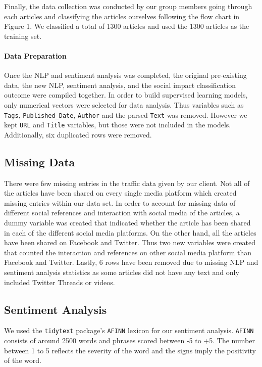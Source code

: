 \documentclass[10pt,letterpaper]{article}
\begin{document}
Finally, the data collection was conducted by our group members going
through each articles and classifying the articles ourselves following
the flow chart in Figure 1. We classified a total of 1300 articles and
used the 1300 articles as the training set.

\hypertarget{data-preparation}{%
\paragraph{Data Preparation}\label{data-preparation}}

Once the NLP and sentiment analysis was completed, the original
pre-existing data, the new NLP, sentiment analysis, and the social
impact classification outcome were compiled together. In order to build
supervised learning models, only numerical vectors were selected for
data analysis. Thus variables such as \texttt{Tags},
\texttt{Published\_Date}, \texttt{Author} and the parsed \texttt{Text}
was removed. However we kept \texttt{URL} and \texttt{Title} variables,
but those were not included in the models. Additionally, six duplicated
rows were removed.

\subsection{Missing Data}\label{missing-data}

There were few missing entries in the traffic data given by our client.
Not all of the articles have been shared on every single media platform
which created missing entries within our data set. In order to account
for missing data of different social references and interaction with
social media of the articles, a dummy variable was created that
indicated whether the article has been shared in each of the different
social media platforms. On the other hand, all the articles have been
shared on Facebook and Twitter. Thus two new variables were created that
counted the interaction and references on other social media platform
than Facebook and Twitter. Lastly, 6 rows have been removed due to
missing NLP and sentiment analysis statistics as some articles did not
have any text and only included Twitter Threads or videos.

\subsection{Sentiment Analysis}\label{sentiment-analysis}

We used the \texttt{tidytext} package's \texttt{AFINN} lexicon for our
sentiment analysis. \texttt{AFINN} consists of around 2500 words and
phrases scored between -5 to +5. The number between 1 to 5 reflects the
severity of the word and the signs imply the positivity of the word.
\end{document}

